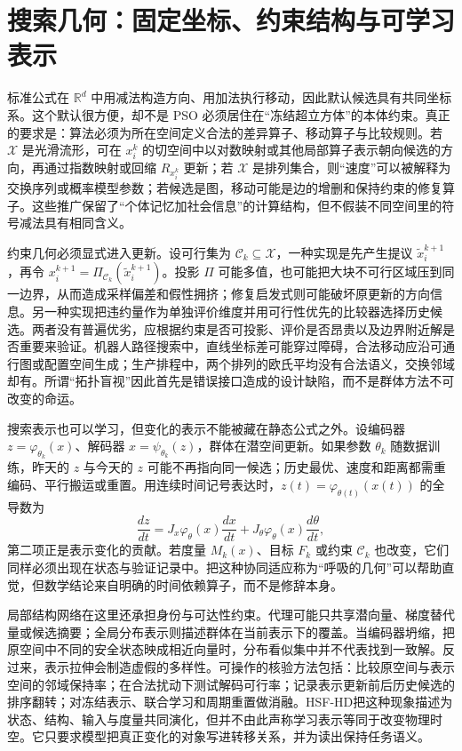 \section{搜索几何：固定坐标、约束结构与可学习表示}
\label{sec:section_8209x}

标准公式在 $\mathbb{R}^{d}$ 中用减法构造方向、用加法执行移动，因此默认候选具有共同坐标系。这个默认很方便，却不是 PSO 必须居住在“冻结超立方体”的本体约束。真正的要求是：算法必须为所在空间定义合法的差异算子、移动算子与比较规则。若 $\mathcal{X}$ 是光滑流形，可在 $x_i^k$ 的切空间中以对数映射或其他局部算子表示朝向候选的方向，再通过指数映射或回缩 $R_{x_i^k}$ 更新；若 $\mathcal{X}$ 是排列集合，则“速度”可以被解释为交换序列或概率模型参数；若候选是图，移动可能是边的增删和保持约束的修复算子。这些推广保留了“个体记忆加社会信息”的计算结构，但不假装不同空间里的符号减法具有相同含义。

约束几何必须显式进入更新。设可行集为 $\mathcal{C}_k\subseteq\mathcal{X}$，一种实现是先产生提议 $\tilde{x}_i^{k+1}$，再令 $x_i^{k+1}=\Pi_{\mathcal{C}_k}(\tilde{x}_i^{k+1})$。投影 $\Pi$ 可能多值，也可能把大块不可行区域压到同一边界，从而造成采样偏差和假性拥挤；修复启发式则可能破坏原更新的方向信息。另一种实现把违约量作为单独评价维度并用可行性优先的比较器选择历史候选。两者没有普遍优劣，应根据约束是否可投影、评价是否昂贵以及边界附近解是否重要来验证。机器人路径搜索中，直线坐标差可能穿过障碍，合法移动应沿可通行图或配置空间生成；生产排程中，两个排列的欧氏平均没有合法语义，交换邻域却有。所谓“拓扑盲视”因此首先是错误接口造成的设计缺陷，而不是群体方法不可改变的命运。

搜索表示也可以学习，但变化的表示不能被藏在静态公式之外。设编码器 $z=\varphi_{\theta_k}(x)$、解码器 $x=\psi_{\theta_k}(z)$，群体在潜空间更新。如果参数 $\theta_k$ 随数据训练，昨天的 $z$ 与今天的 $z$ 可能不再指向同一候选；历史最优、速度和距离都需重编码、平行搬运或重置。用连续时间记号表达时，$z(t)=\varphi_{\theta(t)}(x(t))$ 的全导数为
\[
\frac{dz}{dt}=J_x\varphi_{\theta}(x)\frac{dx}{dt}
+J_\theta\varphi_{\theta}(x)\frac{d\theta}{dt},
\]
第二项正是表示变化的贡献。若度量 $M_k(x)$、目标 $F_k$ 或约束 $\mathcal{C}_k$ 也改变，它们同样必须出现在状态与验证记录中。把这种协同适应称为“呼吸的几何”可以帮助直觉，但数学结论来自明确的时间依赖算子，而不是修辞本身。

局部结构网络在这里还承担身份与可达性约束。代理可能只共享潜向量、梯度替代量或候选摘要；全局分布表示则描述群体在当前表示下的覆盖。当编码器坍缩，把原空间中不同的安全状态映成相近向量时，分布看似集中并不代表找到一致解。反过来，表示拉伸会制造虚假的多样性。可操作的核验方法包括：比较原空间与表示空间的邻域保持率；在合法扰动下测试解码可行率；记录表示更新前后历史候选的排序翻转；对冻结表示、联合学习和周期重置做消融。HSF-HD把这种现象描述为状态、结构、输入与度量共同演化，但并不由此声称学习表示等同于改变物理时空。它只要求模型把真正变化的对象写进转移关系，并为读出保持任务语义。

